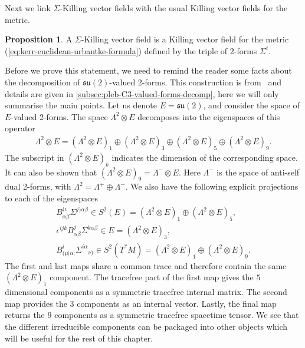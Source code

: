 \documentclass[10pt]{report}
\theoremstyle{definition}
\newtheorem{proposition}{Proposition}[chapter]
\begin{document}
Next we link $\Sigma$-Killing vector fields with the usual Killing vector fields for the metric.
\begin{proposition}\label{prop:Sigma-killing-vector-is-metric-killing-vector}
    A $\Sigma$-Killing vector field is a Killing vector field for the metric (\ref{eq:kerr-euclidean-urbantke-formula}) defined by the triple of 2-forms $\Sigma^i$. 
\end{proposition}

Before we prove this statement, we need to remind the reader some facts about the decomposition of $\mathfrak{su}(2)$-valued 2-forms. This construction is from~\cite{Su2StructureBhoja2024} and details are given in \cref{subsec:pleb-C3-valued-forms-decomp}, here we will only summarise the main points. Let us denote $E=\mathfrak{su}(2)$, and consider the space of $E$-valued 2-forms. The space $\Lambda^2 \otimes E$ decomposes into the eigenspaces of this operator
\begin{align}
    \Lambda^2 \otimes E = {(\Lambda^2 \otimes E)}_1 \oplus {(\Lambda^2 \otimes E)}_3 \oplus {(\Lambda^2 \otimes E)}_5 \oplus {(\Lambda^2 \otimes E)}_9.
\end{align}
The subscript in ${(\Lambda^2 \otimes E)}_k$ indicates the dimension of the corresponding space. It can also be shown that ${(\Lambda^2 \otimes E)}_9 = \Lambda^- \otimes E$. Here $\Lambda^-$ is the space of anti-self dual 2-forms, with $\Lambda^2=\Lambda^+ \oplus \Lambda^-$. We also have the following explicit projections to each of the eigenspaces
\begin{align}\nonumber
B^{(i}_{\alpha\beta} \Sigma^{j)\alpha\beta} \in S^2(E) = (\Lambda^2 \otimes E)_1 \oplus (\Lambda^2 \otimes E)_5, \\
\epsilon^{ijk} B^j_{\alpha\beta} \Sigma^{k\alpha\beta} \in E = (\Lambda^2 \otimes E)_3, \\ \nonumber
B^i_{(\mu|\alpha|} \Sigma^{i\alpha}{}_{\nu)} \in S^2(T^*M) = (\Lambda^2 \otimes E)_1 \oplus (\Lambda^2 \otimes E)_9.
\end{align}
The first and last maps share a common trace and therefore contain the same $(\Lambda^2 \otimes E)_1$ component. The tracefree part of the first map gives the $5$ dimensional components as a symmetric tracefree internal matrix. The second map provides the $3$ components as an internal vector. Lastly, the final map returns the $9$ components as a symmetric tracefree spacetime tensor. We see that the different irreducible components can be packaged into other objects which will be useful for the rest of this chapter.
\end{document}
